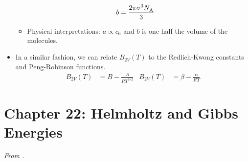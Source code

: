 \documentclass[../notes.tex]{subfiles}
\begin{document}
\begin{itemize}
\begin{itemize}
\begin{align*}
            b &= \frac{2\pi\sigma^3{N_\text{A}^{}}}{3}
        \end{align*}
        \item Physical interpretations: $a\propto c_6$ and $b$ is one-half the volume of the molecules.
    \end{itemize}
    \item In a similar fashion, we can relate $B_{2V}(T)$ to the Redlich-Kwong constants and Peng-Robinson functions.
    \begin{align*}
        B_{2V}(T) &= B-\frac{A}{RT^{3/2}}&
        B_{2V}(T) &= \beta-\frac{\alpha}{RT}
    \end{align*}
\end{itemize}



\section{Chapter 22: Helmholtz and Gibbs Energies}
\emph{From \textcite{bib:McQuarrieSimon}.}
\end{document}
